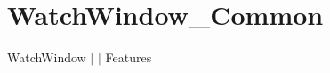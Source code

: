 \chapter{Watch\+Window\+\_\+\+Common }
\hypertarget{md__docs_2_common_2_features_2_watch_window___common}{}\label{md__docs_2_common_2_features_2_watch_window___common}
Watch\+Window \texorpdfstring{$\vert$}{|}  \texorpdfstring{$\vert$}{|} Features



 